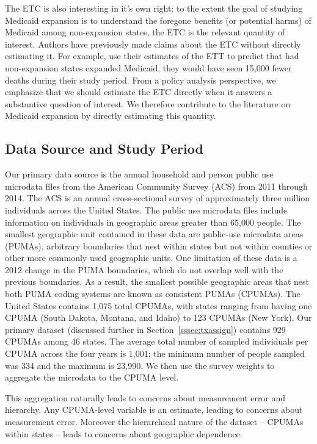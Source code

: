 \documentclass[aoas]{imsart}
\theoremstyle{plain}
\theoremstyle{remark}
\begin{document}
The ETC is also interesting in it's own right: to the extent the goal of studying Medicaid expansion is to understand the foregone benefits (or potential harms) of Medicaid among non-expansion states, the ETC is the relevant quantity of interest. Authors have previously made claims about the ETC without directly estimating it. For example, \cite{miller2019medicaid} use their estimates of the ETT to predict that had non-expansion states expanded Medicaid, they would have seen 15,000 fewer deaths during their study period. From a policy analysis perspective, we emphasize that we should estimate the ETC directly when it answers a substantive question of interest. We therefore contribute to the literature on Medicaid expansion by directly estimating this quantity.

\subsection{Data Source and Study Period}\label{ssec:data}

Our primary data source is the annual household and person public use microdata files from the American Community Survey (ACS) from 2011 through 2014. The ACS is an annual cross-sectional survey of approximately three million individuals across the United States. The public use microdata files include information on individuals in geographic areas greater than 65,000 people. The smallest geographic unit contained in these data are public-use microdata areas (PUMAs), arbitrary boundaries that nest within states but not within counties or other more commonly used geographic units. One limitation of these data is a 2012 change in the PUMA boundaries, which do not overlap well with the previous boundaries. As a result, the smallest possible geographic areas that nest both PUMA coding systems are known as consistent PUMAs (CPUMAs). The United States contains 1,075 total CPUMAs, with states ranging from having one CPUMA (South Dakota, Montana, and Idaho) to 123 CPUMAs (New York). Our primary dataset (discussed further in Section~\ref{sssec:txassign}) contains 929 CPUMAs among 46 states. The average total number of sampled individuals per CPUMA across the four years is 1,001; the minimum number of people sampled was 334 and the maximum is 23,990. We then use the survey weights to aggregate the microdata to the CPUMA level.  

This aggregation naturally leads to concerns about measurement error and hierarchy. Any CPUMA-level variable is an estimate, leading to concerns about measurement error. Moreover the hierarchical nature of the dataset -- CPUMAs within states -- leads to concerns about geographic dependence.
\end{document}
